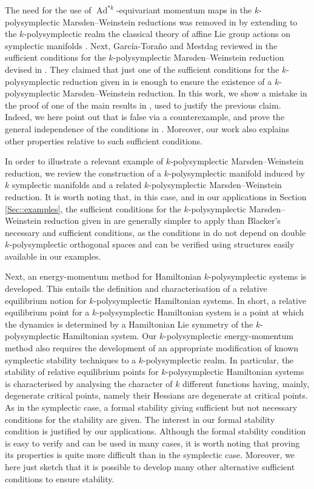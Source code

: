 \documentclass[11pt]{article}
\theoremstyle{plain}
\theoremstyle{definition}
\DeclareMathOperator{\Ad}{Ad}
\numberwithin{equation}{section}
\begin{document}
The need for the use of $\Ad^{*k}$-equivariant momentum maps in the $k$-polysymplectic Marsden--Weinstein reductions was removed in \cite{LRVZ_23} by extending to the $k$-polysymplectic realm the classical theory of affine Lie group actions on symplectic manifolds \cite{OR_04}. Next, Garc\'ia-Tora\~no and Mestdag reviewed in \cite{GM_23} the sufficient conditions for the $k$-polysymplectic Marsden--Weinstein reduction devised in \cite{MRSV_15}. They claimed that just one of the sufficient conditions for the $k$-polysymplectic reduction given in \cite[Theorem 3.17, condition (3.6)]{MRSV_15} is enough to ensure the existence of a $k$-polysymplectic Marsden--Weinstein reduction. In this work, we show a mistake in the proof of one of the main results in \cite{GM_23}, used to justify the previous claim. Indeed, we here point out that \cite[Lemma 3.1]{GM_23} is false via a counterexample, and prove the general independence of the conditions in \cite[Theorem 3.17]{MRSV_15}. Moreover, our work also explains other properties relative to such sufficient conditions.  

In order to illustrate a relevant example of $k$-polysymplectic Marsden--Weinstein reduction, we review the construction of a $k$-polysymplectic manifold induced by $k$ symplectic manifolds and a related $k$-polysymplectic Marsden--Weinstein reduction. It is worth noting that, in this case, and in our applications in 
Section \ref{Sec::examples}, the sufficient conditions for the $k$-polysymplectic Marsden--Weinstein reduction given in \cite{MRSV_15} are generally simpler to apply than  Blacker's necessary and sufficient conditions, as the conditions in \cite{MRSV_15} do not depend on double $k$-polysymplectic orthogonal spaces and can be verified using structures easily available in our examples.

Next, an energy-momentum method for Hamiltonian $k$-polysymplectic systems is developed. This entails the definition and characterisation of a relative equilibrium notion for $k$-polysymplectic Hamiltonian systems. In short, a relative equilibrium point for a $k$-polysymplectic Hamiltonian 
 system is a point at which the dynamics is determined by a Hamiltonian Lie symmetry of the $k$-polysymplectic Hamiltonian system.
Our $k$-polysymplectic energy-momentum method also requires the development of an appropriate modification of known symplectic stability techniques to a $k$-polysymplectic realm. In particular, the stability of relative equilibrium points for $k$-polysymplectic Hamiltonian systems is characterised by analysing the character of $k$ different functions having, mainly, degenerate critical points, namely their Hessians are degenerate at critical points. As in the symplectic case, a formal stability giving sufficient but not necessary conditions for the stability are given. The interest in our formal stability condition is justified by our applications. Although the formal stability condition is easy to verify and can be used in many cases, it is worth noting that proving its properties is quite more difficult than in the symplectic case. Moreover, we here just sketch that it is possible to develop many other alternative sufficient conditions to ensure stability. 
\end{document}
